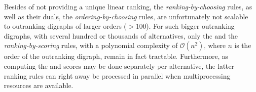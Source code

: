 Besides of not providing a unique linear ranking, the \emph{ranking-by-choosing} rules, as well as their duals, the \emph{ordering-by-choosing} rules, are unfortunately not scalable to outranking digraphs of larger orders ($> 100$). For such bigger outranking digraphs, with several hundred or thousands of alternatives, only the \Copeland and the \NetFlows \emph{ranking-by-scoring} rules, with a polynomial complexity of $\mathcal{O}(n^2)$, where $n$ is the order of the outranking digraph, remain in fact tractable. Furthermore, as computing the \Copeland and \NetFlows scores may be done separately per alternative, the latter ranking rules can right away be processed in parallel when multiprocessing resources are available.

\vspace{1cm}

\clearpage


%